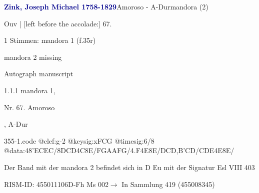 \documentclass[twocolumn, 12pt]{book}
\begin{document}
\par \vspace{16pt} \textcolor{darkblue}{\textbf{Zink, Joseph Michael  1758-1829}}\hfillplus{\textbf{[355]}}\newline Amoroso - A-Dur\newline mandora (2)
\par \begin{itshape}[f.35r, at left:] Ouv | [left before the accolade:] 67.\end{itshape} 
\par \textcolor{darkblue}{}  1 Stimmen: mandora 1  (f.35r)\newline \begin{small} mandora 2 missing\end{small} \newline Autograph manuscript
\par 1.1.1  mandora 1, \begin{itshape}Nr. 67. Amoroso\end{itshape}, A-Dur  
\begin{filecontents*}{355-1.code}
@clef:g-2
@keysig:xFCG
@timesig:6/8
@data:48'ECEC/8DCD4C8E/FGAAFG/4.F4E8E/DCD,B'CD/CDE4E8E/
\end{filecontents*}
\newline %
\par Der Band mit der mandora 2 befindet sich in D Eu mit der Signatur Esl VIII 403
\par RISM-ID: 455011106\newline D-Fh  Ms 002\newline $\rightarrow$ In Sammlung 419 (455008345)
      
\end{document}
